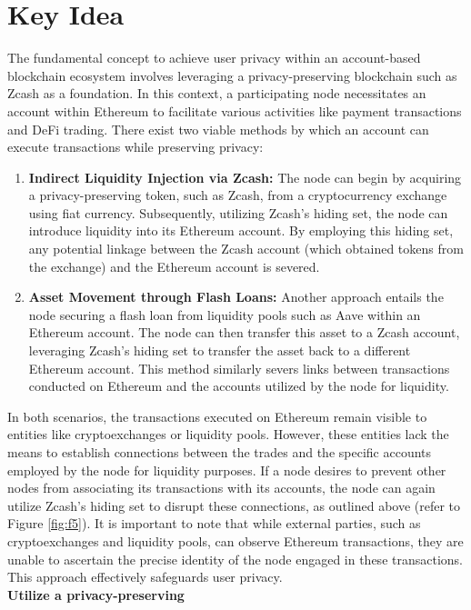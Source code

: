 \documentclass{report}
\begin{document}
\section{Key Idea}
The fundamental concept to achieve user privacy within an account-based blockchain ecosystem involves leveraging a privacy-preserving blockchain such as Zcash as a foundation. In this context, a participating node necessitates an account within Ethereum to facilitate various activities like payment transactions and DeFi trading. There exist two viable methods by which an account can execute transactions while preserving privacy:\\
\begin{enumerate}
	\item \textbf{Indirect Liquidity Injection via Zcash:} The node can begin by acquiring a privacy-preserving token, such as Zcash, from a cryptocurrency exchange using fiat currency. Subsequently, utilizing Zcash's hiding set, the node can introduce liquidity into its Ethereum account. By employing this hiding set, any potential linkage between the Zcash account (which obtained tokens from the exchange) and the Ethereum account is severed.
	\item \textbf{Asset Movement through Flash Loans:} Another approach entails the node securing a flash loan from liquidity pools such as Aave within an Ethereum account. The node can then transfer this asset to a Zcash account, leveraging Zcash's hiding set to transfer the asset back to a different Ethereum account. This method similarly severs links between transactions conducted on Ethereum and the accounts utilized by the node for liquidity.
\end{enumerate}
In both scenarios, the transactions executed on Ethereum remain visible to entities like cryptoexchanges or liquidity pools. However, these entities lack the means to establish connections between the trades and the specific accounts employed by the node for liquidity purposes. If a node desires to prevent other nodes from associating its transactions with its accounts, the node can again utilize Zcash's hiding set to disrupt these connections, as outlined above (refer to Figure \ref{fig:f5}). It is important to note that while external parties, such as cryptoexchanges and liquidity pools, can observe Ethereum transactions, they are unable to ascertain the precise identity of the node engaged in these transactions. This approach effectively safeguards user privacy.\\
\textbf{Utilize a privacy-preserving}\\
\end{document}
